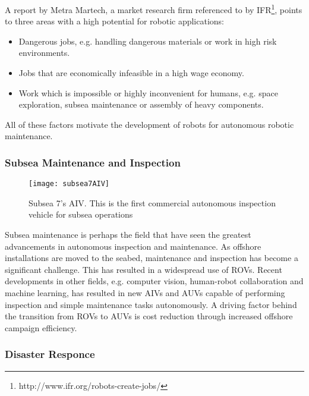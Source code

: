 A report by Metra Martech\cite{metraMartechGorle}, a market research firm referenced to by \ac{IFR}\footnote{http://www.ifr.org/robots-create-jobs/}, points to three areas with a high potential for robotic applications:

\begin{itemize}
	\item Dangerous jobs, e.g. handling dangerous materials or work in high risk environments.
	\item Jobs that are economically infeasible in a high wage economy.
	\item Work which is impossible or highly inconvenient for humans, e.g. space exploration, subsea maintenance or assembly of heavy components.
\end{itemize}

All of these factors motivate the development of robots for autonomous robotic maintenance. 

\subsubsection{Subsea Maintenance and Inspection}

\begin{wrapfigure}{r}{0.5\textwidth}
	\vspace{-20pt}
	\begin{center}
		\texttt{[image: subsea7AIV]}
	\end{center}
	
	\caption{Subsea 7's AIV. This is the first commercial autonomous inspection vehicle for subsea operations \cite{pressAIV}}
\end{wrapfigure}

Subsea maintenance is perhaps the field that have seen the greatest advancements in autonomous inspection and maintenance. As offshore installations are moved to the seabed, maintenance and inspection has become a significant challenge. This has resulted in a widespread use of \acp{ROV}. Recent developments in other fields, e.g. computer vision, human-robot collaboration and machine learning, has resulted in new \acp{AIV} and \acp{AUV} capable of performing inspection and simple maintenance tasks autonomously\cite{subseaAIV}\cite{Ridao2015227}. A driving factor behind the transition from \acp{ROV} to \acp{AUV} is cost reduction through increased offshore campaign efficiency.

\subsubsection{Disaster Responce}

